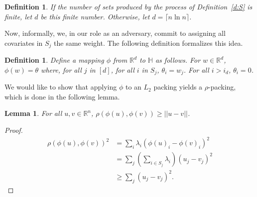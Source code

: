 \documentclass[11pt,notitlepage]{article}
\newcommand\bbH{\mathbb{H}}
\newcommand\R {\mathbb{R}}
\newtheorem{definition}[theorem]{Definition}
\newtheorem{lemma}[theorem]{Lemma}
\begin{document}
\begin{definition}
If the number of sets produced by the process
of Definition~\ref{d:S} is finite, let $d$ be this
finite number.  Otherwise, let $d = \lceil n \ln n \rceil$.
\end{definition}

Now, informally, we, in our role as an adversary, commit to
assigning all covariates in $S_j$ the same weight.  The
following definition formalizes this idea.
\begin{definition}
Define a mapping $\phi$ from $\R^d$ to $\bbH$ as follows.
For $w \in \R^d$, $\phi(w) = \theta$ where, for all
$j$ in $[d]$, for all $i$ in $S_j$, $\theta_i = w_j$.
For all $i > i_d$, $\theta_i = 0$.
\end{definition}

We would like to show that applying $\phi$ to an
$L_2$ packing yields a $\rho$-packing, which is done
in the following lemma.
\begin{lemma}
\label{l:rho.by.ell2}
For all $u,v \in \R^n$, $\rho(\phi(u), \phi(v)) \geq || u - v ||$.
\end{lemma}
\begin{proof}
\begin{align*}
\rho(\phi(u), \phi(v))^2 
& = \sum_i \lambda_i (\phi(u)_i - \phi(v)_i)^2 \\
& = \sum_j \left( \sum_{i \in S_j} \lambda_i \right) (u_j - v_j)^2 \\
& \geq \sum_j (u_j - v_j)^2.
\end{align*}
\end{proof}
\end{document}
